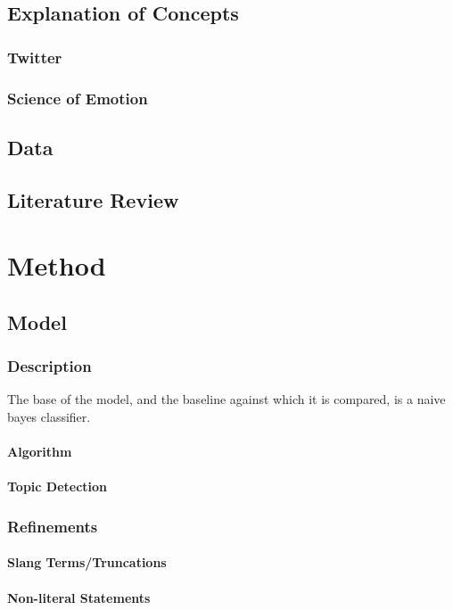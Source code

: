 \documentclass[12pt,twoside]{report}
\begin{document}
	\section{Explanation of Concepts}
		\subsection{Twitter}
		\subsection{Science of Emotion}
	\section{Data}
	\section{Literature Review}
\chapter{Method}
	\section{Model}
		\subsection{Description}
		The base of the model, and the baseline against which it is compared, is a naive bayes classifier.
				\subsubsection{Algorithm}
				\subsubsection{Topic Detection}
		\subsection{Refinements}
			\subsubsection{Slang Terms/Truncations}
			\subsubsection{Non-literal Statements}
\end{document}
